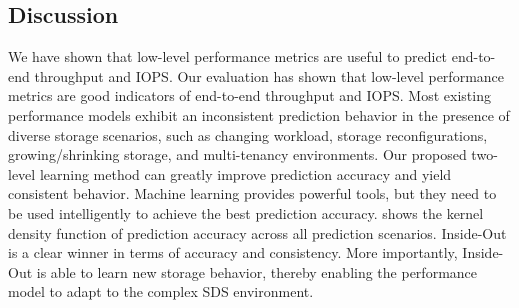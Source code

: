\vspace{1ex}
\subsection{Discussion}
We have shown that low-level performance metrics are useful to predict end-to-end throughput and IOPS.
Our evaluation has shown that low-level performance metrics are good indicators of end-to-end throughput and IOPS. 
Most existing performance models exhibit an inconsistent prediction behavior in the presence of diverse storage scenarios, 
such as changing workload, storage reconfigurations,
growing/shrinking storage, and multi-tenancy environments.
Our proposed two-level learning method can greatly improve prediction accuracy and yield consistent behavior.
Machine learning provides powerful tools, but they need to be used intelligently to achieve the best prediction accuracy. 
\myfigure{\ref{fig:aggregate}} shows the kernel density function of prediction accuracy across all prediction scenarios.
Inside-Out is a clear winner in terms of accuracy and consistency. 
More importantly, Inside-Out is able to learn new storage behavior, thereby enabling the performance model to adapt to the complex SDS environment.




